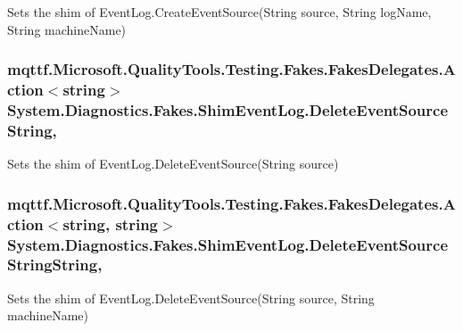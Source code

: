Sets the shim of Event\-Log.\-Create\-Event\-Source(\-String source, String log\-Name, String machine\-Name)

\hypertarget{class_system_1_1_diagnostics_1_1_fakes_1_1_shim_event_log_a25ea5f834f866d0371dc57cc7c4d5370}{
\subsubsection[{Delete\-Event\-Source\-String}]{\setlength{\rightskip}{0pt plus 5cm}mqttf.\-Microsoft.\-Quality\-Tools.\-Testing.\-Fakes.\-Fakes\-Delegates.\-Action$<$string$>$ System.\-Diagnostics.\-Fakes.\-Shim\-Event\-Log.\-Delete\-Event\-Source\-String\hspace{0.3cm}{\ttfamily [static]}, {\ttfamily [set]}}}\label{class_system_1_1_diagnostics_1_1_fakes_1_1_shim_event_log_a25ea5f834f866d0371dc57cc7c4d5370}


Sets the shim of Event\-Log.\-Delete\-Event\-Source(\-String source)

\hypertarget{class_system_1_1_diagnostics_1_1_fakes_1_1_shim_event_log_a63d3dc15f3f7f951a24433fd3aa87c37}{
\subsubsection[{Delete\-Event\-Source\-String\-String}]{\setlength{\rightskip}{0pt plus 5cm}mqttf.\-Microsoft.\-Quality\-Tools.\-Testing.\-Fakes.\-Fakes\-Delegates.\-Action$<$string, string$>$ System.\-Diagnostics.\-Fakes.\-Shim\-Event\-Log.\-Delete\-Event\-Source\-String\-String\hspace{0.3cm}{\ttfamily [static]}, {\ttfamily [set]}}}\label{class_system_1_1_diagnostics_1_1_fakes_1_1_shim_event_log_a63d3dc15f3f7f951a24433fd3aa87c37}


Sets the shim of Event\-Log.\-Delete\-Event\-Source(\-String source, String machine\-Name)


